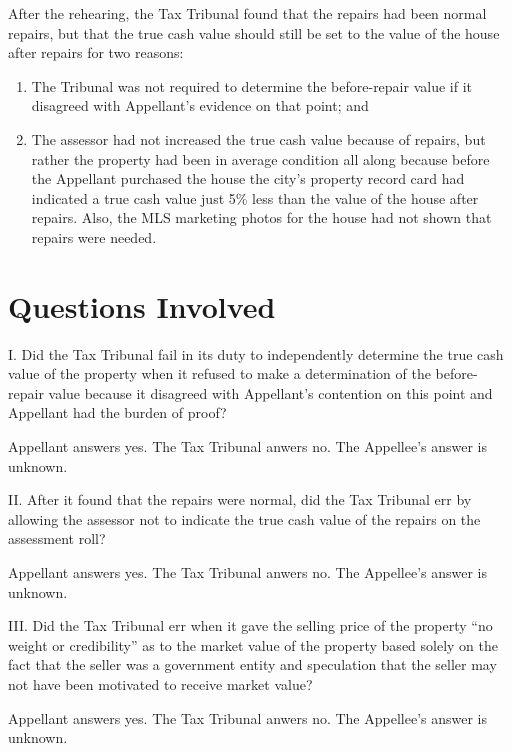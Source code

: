 \documentclass[12pt,\documentclassflag]{michiganCourtOfAppealsBrief}
\begin{document}
After the rehearing, the Tax Tribunal found that the repairs had been normal repairs, but that the true cash value should still be set to the value of the house after repairs for two reasons:

\begin{enumerate}
	\item The Tribunal was not required to determine the before-repair value if it disagreed with Appellant's evidence on that point; and
	\item The assessor had not increased the true cash value because of repairs, but rather the property had been in average condition all along because before the Appellant purchased the house the city's property record card had indicated a true cash value just 5\% less than the value of the house after repairs. Also, the MLS marketing photos for the house had not shown that repairs were needed. 
\end{enumerate}


\newpage 
\section{Questions Involved}

\noindent I. Did the Tax Tribunal fail in its duty to independently determine the true cash value of the property when it refused to make a determination of the before-repair value because it disagreed with Appellant's contention on this point and Appellant had the burden of proof?

Appellant answers yes. The Tax Tribunal anwers no. The Appellee's answer is unknown. 
\vspace{\baselineskip}

\noindent II. After it found that the repairs were normal, did the Tax Tribunal err by allowing the assessor not to indicate the true cash value of the repairs on the assessment roll?

Appellant answers yes. The Tax Tribunal anwers no. The Appellee's answer is unknown. 
\vspace{\baselineskip}

\noindent III. Did the Tax Tribunal err when it gave the selling price of the property ``no weight or credibility'' as to the market value of the property based solely on the fact that the seller was a government entity and speculation that the seller may not have been motivated to receive market value?

Appellant answers yes. The Tax Tribunal anwers no. The Appellee's answer is unknown. 
\vspace{\baselineskip}
\end{document}
